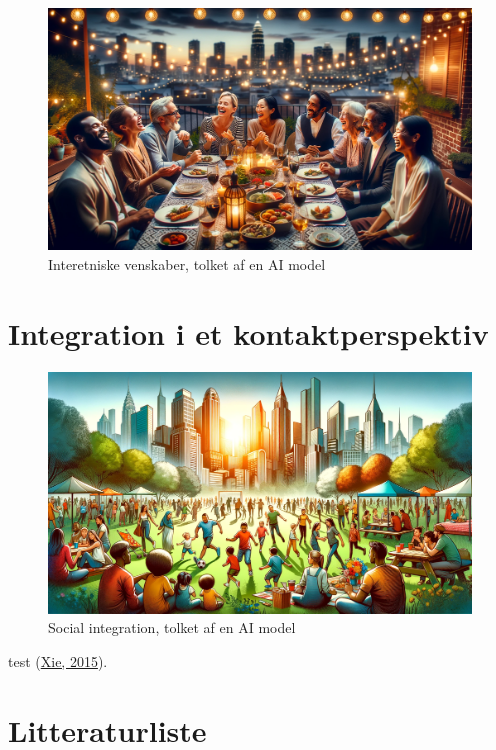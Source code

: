 \documentclass[
]{book}
\begin{document}
\begin{figure}
\includegraphics[width=24.89in]{images/dalle-friendships} \caption{Interetniske venskaber, tolket af en AI model}\label{fig:fig-friendships}
\end{figure}

\hypertarget{kap7}{%
\chapter{Integration i et kontaktperspektiv}\label{kap7}}

\begin{figure}
\includegraphics[width=24.89in]{images/dalle-integration} \caption{Social integration, tolket af en AI model}\label{fig:fig-integration}
\end{figure}

test (\protect\hyperlink{ref-xie2015}{Xie, 2015}).

\hypertarget{litteraturliste}{%
\chapter*{Litteraturliste}\label{litteraturliste}}
\end{document}
